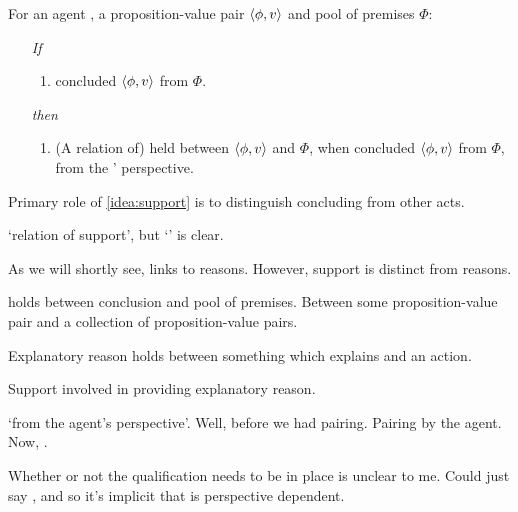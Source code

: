 \begin{note}
  \begin{idea}[Support I]
    \label{idea:support}
    For an agent \vAgent{}, a proposition-value pair \(\langle \phi, v \rangle\) and pool of premises \(\Phi\):

    \begin{itemize}
    \item[\emph{If}]
      \begin{enumerate}[label=\alph*., ref=(\alph*)]
      \item
        \vAgent{} concluded \(\langle \phi, v \rangle\) from \(\Phi\).
      \end{enumerate}
      \item[\emph{then}]
        \begin{enumerate}[label=\alph*., ref=(\alph*), resume]
        \item
          (A relation of) \emph{\support{}} held between \(\langle \phi, v \rangle\) and \(\Phi\), when \vAgent{} concluded \(\langle \phi, v \rangle\) from \(\Phi\), from the \vAgent{}' perspective.
        \end{enumerate}
      \end{itemize}
      \vspace{-\baselineskip}
  \end{idea}

  Primary role of \autoref{idea:support} is to distinguish concluding from other acts.

  `relation of support', but `\support{}' is clear.
\end{note}

\begin{note}
  As we will shortly see, links to reasons.
  However, support is distinct from reasons.

   holds between conclusion and pool of premises.
  Between some proposition-value pair and a collection of proposition-value pairs.

  Explanatory reason holds between something which explains and an action.

  Support involved in providing explanatory reason.
\end{note}

\begin{note}
  `from the agent's perspective'.
  Well, before we had pairing.
  Pairing by the agent.
  Now, \support{}.

  Whether or not the qualification needs to be in place is unclear to me.
  Could just say \support{}, and so it's implicit that \support{} is perspective dependent.
\end{note}

